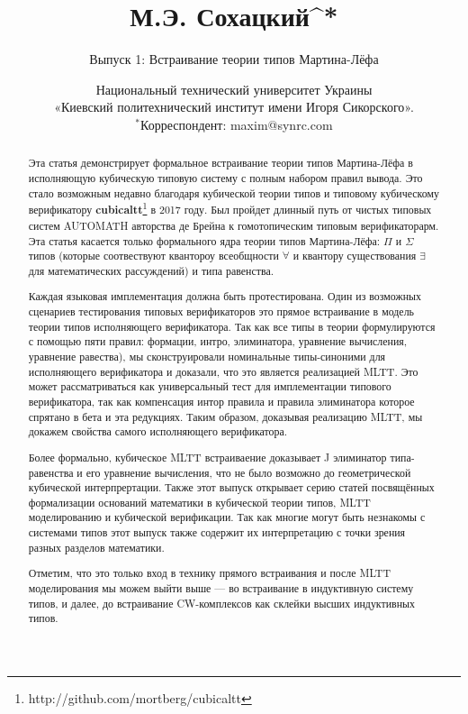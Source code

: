 \documentclass{article}
\theoremstyle{definition}
\begin{document}
\title{\small М.Э. Сохацкий^{*}}
\author{Выпуск 1: Встраивание теории типов Мартина-Лёфа}
\date{ \small Национальный технический университет Украины \\
      «Киевский политехнический институт имени Игоря Сикорского».\\
       \small $^*$Корреспондент: maxim@synrc.com}

\maketitle

\begin{abstract}

Эта статья демонстрирует формальное встраивание теории типов Мартина-Лёфа
в исполняющую кубическую типовую систему с полным набором правил вывода.
Это стало возможным недавно благодаря кубической теории типов и типовому кубическому
верификатору {\bf cubicaltt}\footnote{http://github.com/mortberg/cubicaltt} в 2017 году.
Был пройдет длинный путь от чистых типовых систем AUTOMATH авторства де Брейна к
гомотопическим типовым верификаторарм. Эта статья касается только формального ядра
теории типов Мартина-Лёфа: $\Pi$ и $\Sigma$ типов (которые соотвествуют
квантороу всеобщности $\forall$ и квантору существования $\exists$ для математических рассуждений)
и типа равенства.

Каждая языковая имплементация должна быть протестирована. Один из возможных
сценариев тестирования типовых верификаторов это прямое встраивание в модель
теории типов исполняющего верификатора. Так как все типы в теории формулируются
с помощью пяти правил: формации, интро, элиминатора, уравнение вычисления, уравнение равества),
мы сконструировали номинальные типы-синоними для исполняющего верификатора и доказали,
что это является реализацией MLTT. Это может рассматриваться как универсальный
тест для имплементации типового верификатора, так как компенсация интор правила и правила элиминатора
которое спрятано в бета и эта редукциях. Таким образом, доказывая реализацию MLTT,
мы докажем свойства самого исполняющего верификатора.

Более формально, кубическое MLTT встраиваение доказывает J элиминатор
типа-равенства и его уравнение вычисления, что не было возможно до
геометрической кубической интерпрертации. Также этот выпуск открывает
серию статей посвящённых формализации оснований математики в кубической теории типов,
MLTT моделированию и кубической верификации. Так как многие могут быть незнакомы
с системами типов этот выпуск также содержит их интерпретацию с точки
зрения разных разделов математики.

Отметим, что это только вход в технику прямого встраивания и после MLTT
моделирования мы можем выйти выше — во встраивание в индуктивную систему типов,
и далее, до встраивание CW-комплексов как склейки высших индуктивных типов.

\end{abstract}
\end{document}
